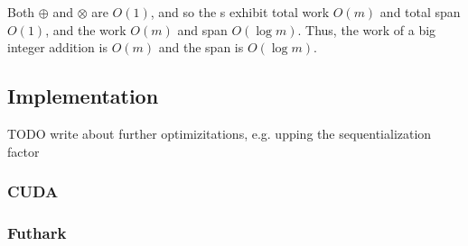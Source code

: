 Both $\oplus$ and $\otimes$ are $O(1)$, and so the s exhibit total work $O(m)$ and total span $O(1)$, and the  work $O(m)$ and span $O(\log m)$. Thus, the work of a big integer addition is $O(m)$ and the span is $O(\log m)$.

\subsection{Implementation}

{\color{red} TODO write about further optimizitations, e.g. upping the sequentialization factor}

\subsubsection{CUDA}

\subsubsection{Futhark}

